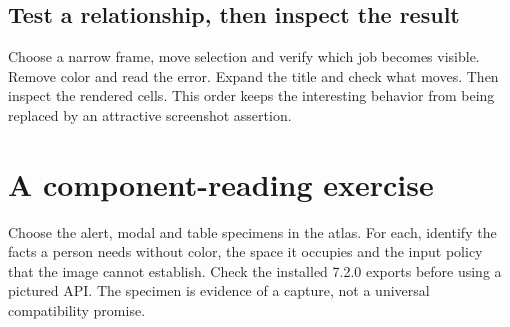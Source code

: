 \subsection{Test a relationship, then inspect the result}

Choose a narrow frame, move selection and verify which job becomes visible. Remove color and read the error. Expand the title and check what moves. Then inspect the rendered cells. This order keeps the interesting behavior from being replaced by an attractive screenshot assertion.

\section{A component-reading exercise}

Choose the alert, modal and table specimens in the atlas. For each, identify the facts a person needs without color, the space it occupies and the input policy that the image cannot establish. Check the installed 7.2.0 exports before using a pictured API. The specimen is evidence of a capture, not a universal compatibility promise.
